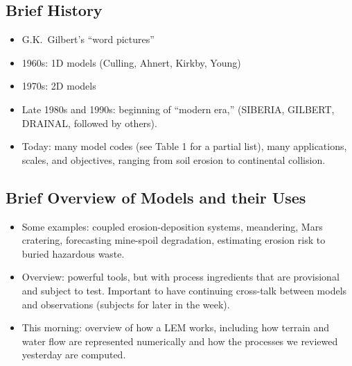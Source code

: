 \documentclass[12pt]{amsart}
\begin{document}
\subsection{Brief History}
\begin{itemize}
\item G.K.\ Gilbert's ``word pictures'' \citep{gilbert1877report}
\item 1960s: 1D models (Culling, Ahnert, Kirkby, Young)
\item 1970s: 2D models 
\item Late 1980s and 1990s: beginning of ``modern era,'' (SIBERIA, GILBERT, DRAINAL, followed by others).
\item Today: many model codes (see Table 1 for a partial list), many applications, scales, and objectives, ranging from soil erosion to continental collision.
\end{itemize}

\subsection{Brief Overview of Models and their Uses}

\begin{itemize}
\item Some examples: coupled erosion-deposition systems, meandering, Mars cratering, forecasting mine-spoil degradation, estimating erosion risk to buried hazardous waste.
\item Overview: powerful tools, but with process ingredients that are provisional and subject to test. Important to have continuing cross-talk between models and observations (subjects for later in the week).
\item This morning: overview of how a LEM works, including how terrain and water flow are represented numerically and how the processes we reviewed yesterday are computed.
\end{itemize}
\end{document}
